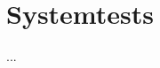 \documentclass[../implementierung.tex]{subfiles}
\begin{document}
\section{Systemtests}
...
\end{document}
